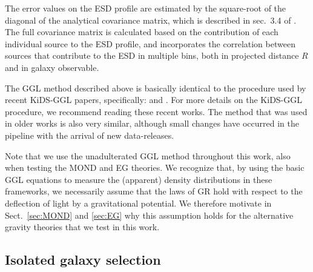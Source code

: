 \documentclass[usenatbib]{mnras}
\begin{document}
The error values on the ESD profile are estimated by the square-root of the diagonal of the analytical covariance matrix, which is described in sec.~3.4 of \cite{viola2015}. The full covariance matrix is calculated based on the contribution of each individual source to the ESD profile, and incorporates the correlation between sources that contribute to the ESD in multiple bins, both in projected distance $R$ and in galaxy observable.

The GGL method described above is basically identical to the procedure used by recent KiDS-GGL papers, specifically: \cite{dvornik2017,dvornik2018} and \cite{brouwer2017,brouwer2018}. For more details on the KiDS-GGL procedure, we recommend reading these recent works. The method that was used in older works \cite[]{viola2015,sifon2015,uitert2016,brouwer2016} is also very similar, although small changes have occurred in the pipeline with the arrival of new data-releases.

Note that we use the unadulterated GGL method throughout this work, also when testing the MOND and EG theories. We recognize that, by using the basic GGL equations to measure the (apparent) density distributions in these frameworks, we necessarily assume that the laws of GR hold with respect to the deflection of light by a gravitational potential. We therefore motivate in Sect.~\ref{sec:MOND} and \ref{sec:EG} why this assumption holds for the alternative gravity theories that we test in this work.


\subsection{Isolated galaxy selection}
\label{sec:isolation}
\end{document}

